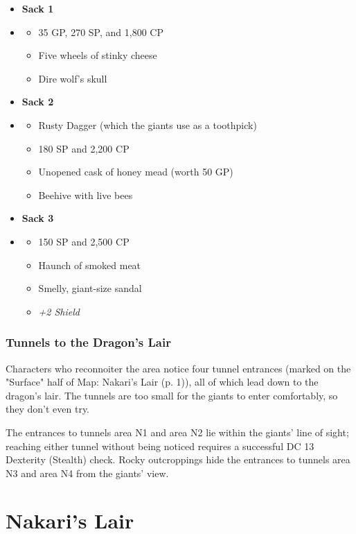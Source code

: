 \documentclass[letterpaper, 11pt, twocolumn]{dndbook}
\begin{document}
\begin{itemize}
\item \textbf{Sack 1}
\item \begin{itemize}
\item 35 GP, 270 SP, and 1,800 CP
\item Five wheels of stinky cheese
\item Dire wolf's skull
\end{itemize}
\item \textbf{Sack 2}
\item \begin{itemize}
\item Rusty Dagger (which the giants use as a toothpick)
\item 180 SP and 2,200 CP
\item Unopened cask of honey mead (worth 50 GP)
\item Beehive with live bees
\end{itemize}
\item \textbf{Sack 3}
\item \begin{itemize}
\item 150 SP and 2,500 CP
\item Haunch of smoked meat
\item Smelly, giant-size sandal
\item \textit{+2 Shield}
\end{itemize}
\end{itemize}

\subsubsection{Tunnels to the Dragon's Lair}

Characters who reconnoiter the area notice four tunnel entrances (marked on the "Surface" half of Map: Nakari's Lair (p. 1)), all of which lead down to the dragon's lair. The tunnels are too small for the giants to enter comfortably, so they don't even try.

The entrances to tunnels area N1 and area N2 lie within the giants' line of sight; reaching either tunnel without being noticed requires a successful DC 13 Dexterity (Stealth) check. Rocky outcroppings hide the entrances to tunnels area N3 and area N4 from the giants' view.
\section{Nakari's Lair}
\end{document}
